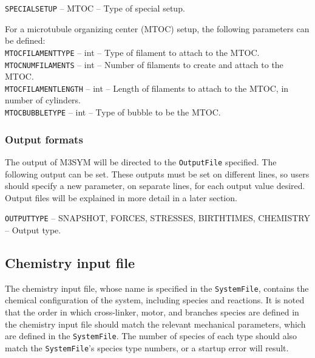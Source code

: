 \documentclass[11pt, oneside]{article}   	%
\begin{document}
\small 

\noindent\texttt{SPECIALSETUP} -- MTOC -- Type of special setup. \\

\normalsize

\noindent For a microtubule organizing center (MTOC) setup, the following parameters can be defined:\\

\small
  \noindent\texttt{MTOCFILAMENTTYPE} -- int -- Type of filament to attach to the MTOC.\\

  \noindent\texttt{MTOCNUMFILAMENTS} -- int -- Number of filaments to create and attach to the MTOC.\\
  
  \noindent\texttt{MTOCFILAMENTLENGTH} -- int -- Length of filaments to attach to the MTOC, in number of cylinders.\\
    
  \noindent\texttt{MTOCBUBBLETYPE} -- int -- Type of bubble to be the MTOC. \\
\normalsize

\subsubsection{Output formats}

The output of M3SYM will be directed to the \texttt{OutputFile} specified. The following output can be set. These outputs must be set on different lines, so users should specify a new parameter, on separate lines, for each output value desired. Output files will be explained in more detail in a later section.\\

\small

  \noindent\texttt{OUTPUTTYPE} -- SNAPSHOT, FORCES, STRESSES, BIRTHTIMES, CHEMISTRY -- Output type.\\
 
\normalsize


\subsection{Chemistry input file}
The chemistry input file, whose name is specified in the \texttt{SystemFile}, contains the chemical configuration of the system, including species and reactions. It is noted that the order in which cross-linker, motor, and branches species are defined in the chemistry input file should match the relevant mechanical parameters, which are defined in the \texttt{SystemFile}. The number of species of each type should also match the \texttt{SystemFile}'s species type numbers, or a startup error will result. \\
\end{document}
